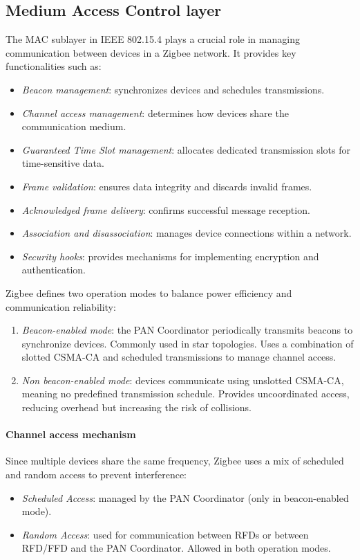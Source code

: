 \subsection{Medium Access Control layer}
The MAC sublayer in IEEE 802.15.4 plays a crucial role in managing communication between devices in a Zigbee network. 
It provides key functionalities such as:
\begin{itemize}
    \item \textit{Beacon management}: synchronizes devices and schedules transmissions.
    \item \textit{Channel access management}: determines how devices share the communication medium.
    \item \textit{Guaranteed Time Slot management}: allocates dedicated transmission slots for time-sensitive data.
    \item \textit{Frame validation}: ensures data integrity and discards invalid frames.
    \item \textit{Acknowledged frame delivery}: confirms successful message reception.
    \item \textit{Association and disassociation}: manages device connections within a network.
    \item \textit{Security hooks}: provides mechanisms for implementing encryption and authentication.
\end{itemize}
\noindent Zigbee defines two operation modes to balance power efficiency and communication reliability:
\begin{enumerate}
    \item \textit{Beacon-enabled mode}: the PAN Coordinator periodically transmits beacons to synchronize devices.
        Commonly used in star topologies.
        Uses a combination of slotted CSMA-CA and scheduled transmissions to manage channel access.
    \item \textit{Non beacon-enabled mode}: devices communicate using unslotted CSMA-CA, meaning no predefined transmission schedule.
        Provides uncoordinated access, reducing overhead but increasing the risk of collisions.
\end{enumerate}

\paragraph*{Channel access mechanism}
Since multiple devices share the same frequency, Zigbee uses a mix of scheduled and random access to prevent interference:
\begin{itemize}
    \item \textit{Scheduled Access}: managed by the PAN Coordinator (only in beacon-enabled mode).
    \item \textit{Random Access}: used for communication between RFDs or between RFD/FFD and the PAN Coordinator.
        Allowed in both operation modes.
\end{itemize}

